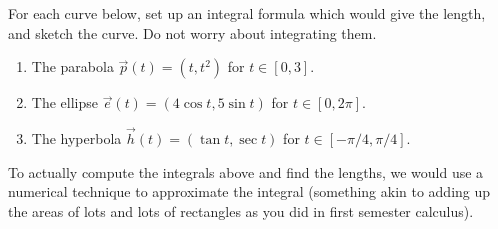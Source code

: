 \begin{problem}
For each curve below, set up an integral formula which would give the length, and sketch the curve. Do not worry about integrating them.  
\begin{enumerate}
\item The parabola $\vec p(t) = (t,t^2)$ for $t\in[0,3]$.
\item The ellipse $\vec e(t) = (4\cos t,5\sin t)$ for $t\in[0,2\pi]$.
\item The hyperbola $\vec h(t) = (\tan t,\sec t)$ for $t\in[-\pi/ 4,\pi/4]$.
\end{enumerate}
\end{problem}
To actually compute the integrals above and find the lengths, we would use a numerical technique to approximate the integral (something akin to adding up the areas of lots and lots of rectangles as you did in first semester calculus).




